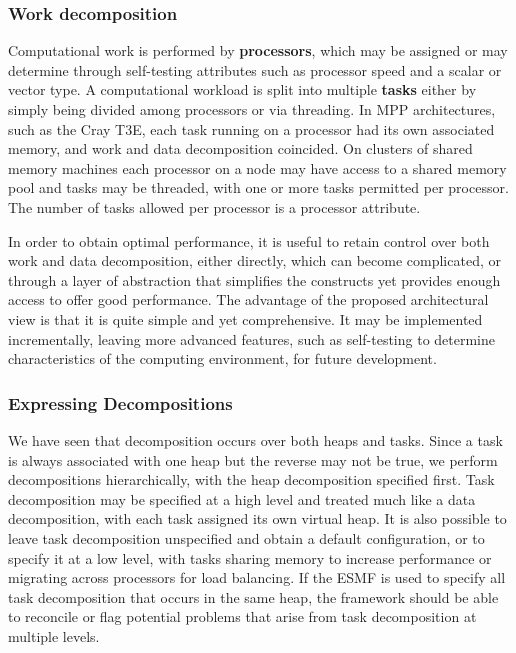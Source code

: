 \subsubsection{Work decomposition}
Computational work is performed by {\bf processors}, which may be assigned
or may determine through self-testing attributes such as processor speed and a scalar or vector type.
A computational workload is split into multiple {\bf tasks} either by simply being divided 
among processors or via threading.  In MPP architectures, such as the Cray T3E, 
each task running on a processor had its own associated memory, and work and data decomposition 
coincided.  On clusters of shared memory machines each processor on a node may have access
to a shared memory pool and tasks may be threaded, with one or more tasks
permitted per processor.  The number of 
tasks allowed per processor is a processor attribute.  

In order to obtain optimal performance, it is useful to retain control over both work and data decomposition, either directly, which can
become complicated, or through a layer of abstraction that simplifies the constructs yet provides
enough access to offer good performance.  The advantage of the proposed architectural view is that it is quite simple and yet comprehensive.  It may be implemented incrementally, leaving more advanced features, such as self-testing to determine characteristics of the computing environment, for future development.

\subsubsection{Expressing Decompositions}

We have seen that decomposition occurs over both heaps and tasks.  Since
a task is always associated with one heap but the reverse may not be true,
we perform decompositions hierarchically, with the heap decomposition
specified first.  Task decomposition may be specified at a high level
and treated much like a data decomposition, with each task assigned its 
own virtual heap.  It is also possible to leave task decomposition 
unspecified and obtain a default configuration, or to specify it at a 
low level, with tasks sharing memory to increase performance or migrating 
across processors for load balancing.  If the ESMF is used to specify 
all task decomposition
that occurs in the same heap, the framework should be able to reconcile 
or flag potential problems that arise from task decomposition at multiple
levels.

